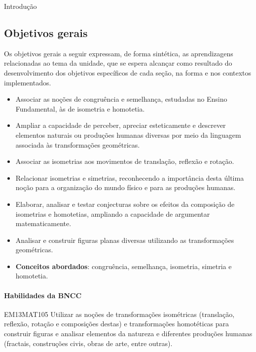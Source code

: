 \mainmatter

\begin{apresentacao}{Introdução}
\subsection{Objetivos gerais}

Os objetivos gerais a seguir expressam, de forma sintética, as aprendizagens relacionadas ao tema da unidade, que se espera alcançar como resultado do desenvolvimento dos objetivos específicos de cada seção, na forma e nos contextos implementados. 
\begin{itemize}
\item Associar as noções de congruência e semelhança, estudadas no Ensino Fundamental, às de isometria e homotetia.
\item Ampliar a capacidade de perceber, apreciar esteticamente e descrever elementos naturais ou produções humanas diversas por meio da linguagem associada às transformações geométricas.
\item Associar as isometrias aos movimentos de translação, reflexão e rotação. 
\item Relacionar isometrias e simetrias, reconhecendo a importância desta última noção para a organização do mundo físico e para as produções humanas.
\item Elaborar, analisar e testar conjecturas sobre os efeitos da composição de isometrias e homotetias, ampliando a capacidade de argumentar matematicamente. 
\item Analisar e construir figuras planas diversas utilizando as transformações geométricas.
\item \textbf{Conceitos abordados}: congruência, semelhança, isometria, simetria e homotetia.
\end{itemize}

\paragraph{Habilidades da BNCC}
\begin{habilities}{EM13MAT105}
Utilizar as noções de transformações isométricas (translação, reflexão, rotação e composições destas) e transformações homotéticas para construir figuras e analisar elementos da natureza e diferentes produções humanas (fractais, construções civis, obras de arte, entre outras).
\end{habilities}




\end{apresentacao}
